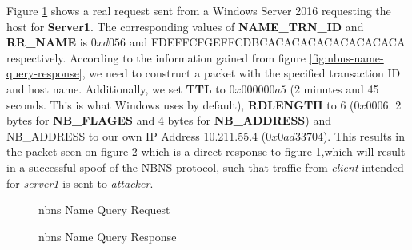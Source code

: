 \documentclass{article}
\begin{document}
Figure \ref{fig:nbns-request} shows a real request sent from a Windows Server 2016 requesting the host for \textbf{Server1}. The corresponding values of \textbf{NAME\_TRN\_ID} and \textbf{RR\_NAME} is $0xd056$ and FDEFFCFGEFFCDBCACACACACACACACACA respectively. According to the information gained from figure \ref{fig:nbns-name-query-response}, we need to construct a packet with the specified transaction ID and host name. Additionally, we set \textbf{TTL} to $0x000000a5$ (2 minutes and 45 seconds. This is what Windows uses by default), \textbf{RDLENGTH} to 6 ($0x0006$. 2 bytes for \textbf{NB\_FLAGES} and 4 bytes for \textbf{NB\_ADDRESS}) and NB\_ADDRESS to our own IP Address 10.211.55.4 ($0x0ad33704$). This results in the packet seen on figure \ref{fig:nbns-response} which is a direct response to figure \ref{fig:nbns-request},which will result in a successful spoof of the NBNS protocol, such that traffic from \emph{client} intended for \emph{server1} is sent to \emph{attacker}.

\begin{figure}[H]
	\scriptsize
	\par
	\centering
	\varwidth{\linewidth}
	
	\endvarwidth
	\par

	\caption{\gls{nbns} Name Query Request}
	\label{fig:nbns-request}
\end{figure}

\begin{figure}[H]
	\scriptsize
	\par
	\centering
	\varwidth{\linewidth}
	
	\endvarwidth
	\par

	\caption{\gls{nbns} Name Query Response}
	\label{fig:nbns-response}
\end{figure}
\end{document}
